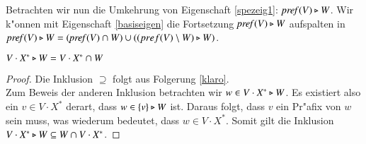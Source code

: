 Betrachten wir nun die Umkehrung von Eigenschaft \ref{spezeig1}: $\mathit{pref{(}}V)\triangleright W$. Wir k"onnen mit Eigenschaft \ref{basiseigen} die Fortsetzung $\mathit{pref{(}}V)\triangleright W$ aufspalten in $\mathit{pref{(}}V)\triangleright W= (\mathit{pref{(}}V)\cap W) \cup ((pref(V)\setminus W)\triangleright W)$.


\vspace{2ex}

\begin{eigen}
$V\cdot X^* \triangleright W = V\cdot X^* \cap W$
\end{eigen}
\begin{proof}
Die Inklusion $\supseteq$ folgt aus Folgerung \ref{klaro}.\\
Zum Beweis der anderen Inklusion betrachten wir $w\in V\cdot X^* \triangleright W$. Es existiert also ein $v\in V\cdot X^*$ derart, dass $w\in \{v\}\triangleright W$ ist. Daraus folgt, dass $v$ ein Pr"afix von $w$ sein muss, was wiederum bedeutet, dass $w\in V\cdot X^*$. Somit gilt die Inklusion $V\cdot X^* \triangleright W \subseteq W\cap V\cdot X^*$.
\end{proof}


